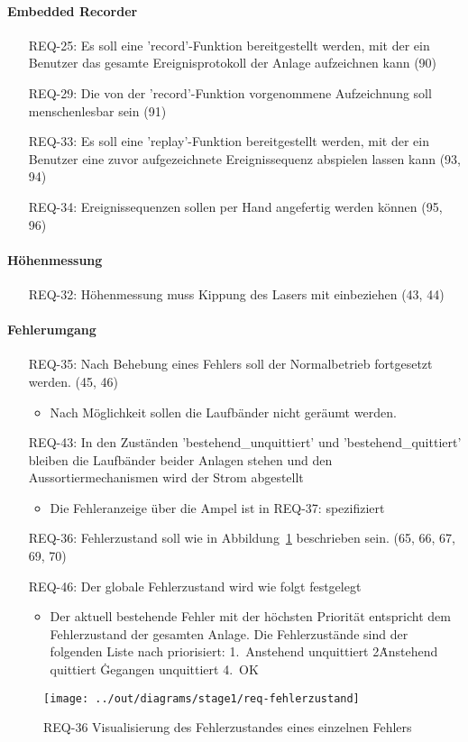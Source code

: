 \paragraph{Embedded Recorder}
\begin{itemize}
    \item[REQ-25:] Es soll eine 'record'-Funktion bereitgestellt werden, mit der ein Benutzer das gesamte
    Ereignisprotokoll der Anlage aufzeichnen kann (90)
    \item[REQ-29:] Die von der 'record'-Funktion vorgenommene Aufzeichnung soll menschenlesbar sein (91)
    \item[REQ-33:] Es soll eine 'replay'-Funktion bereitgestellt werden, mit der ein
    Benutzer eine zuvor aufgezeichnete Ereignissequenz abspielen lassen kann (93, 94)
    \item[REQ-34:] Ereignissequenzen sollen per Hand angefertig werden können (95, 96)
\end{itemize}

\paragraph{Höhenmessung}
\begin{itemize}
    \item[REQ-32:] Höhenmessung muss Kippung des Lasers mit einbeziehen (43, 44)
\end{itemize}

\paragraph{Fehlerumgang}
\begin{itemize}
    \item[REQ-35:] Nach Behebung eines Fehlers soll der Normalbetrieb fortgesetzt werden. (45, 46)
    \begin{itemize}
        \item Nach Möglichkeit sollen die Laufbänder nicht geräumt werden.
    \end{itemize}
    \item[REQ-43:] In den Zuständen 'bestehend\_unquittiert' und 'bestehend\_quittiert' bleiben die
    Laufbänder beider Anlagen stehen und den Aussortiermechanismen wird der Strom abgestellt
    \begin{itemize}
        \item Die Fehleranzeige über die Ampel ist in REQ-37: spezifiziert
    \end{itemize}
    \item[REQ-36:] Fehlerzustand soll wie in Abbildung~\ref{fig:stm-fehlerzustand} beschrieben sein. (65, 66, 67, 69, 70)
    \item[REQ-46:] Der globale Fehlerzustand wird wie folgt festgelegt
    \begin{itemize}
        \item Der aktuell bestehende Fehler mit der höchsten Priorität entspricht dem Fehlerzustand der gesamten Anlage.
        Die Fehlerzustände sind der folgenden Liste nach priorisiert: 1.\ Anstehend unquittiert 2\.
        Anstehend quittiert \. Gegangen unquittiert 4.\ OK
    \end{itemize}
\end{itemize}

\begin{figure}[h]
    \centering
    \texttt{[image: ../out/diagrams/stage1/req-fehlerzustand]}
    \caption{REQ-36 Visualisierung des Fehlerzustandes eines einzelnen Fehlers}
    \label{fig:stm-fehlerzustand}
\end{figure}
